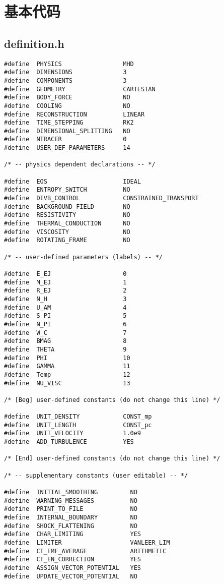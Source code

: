 \chapter{基本代码}
\label{Basic}

\section{definition.h}
\label{def}
\begin{lstlisting}
#define  PHYSICS                 MHD
#define  DIMENSIONS              3
#define  COMPONENTS              3
#define  GEOMETRY                CARTESIAN
#define  BODY_FORCE              NO
#define  COOLING                 NO
#define  RECONSTRUCTION          LINEAR
#define  TIME_STEPPING           RK2
#define  DIMENSIONAL_SPLITTING   NO
#define  NTRACER                 0
#define  USER_DEF_PARAMETERS     14

/* -- physics dependent declarations -- */

#define  EOS                     IDEAL
#define  ENTROPY_SWITCH          NO
#define  DIVB_CONTROL            CONSTRAINED_TRANSPORT
#define  BACKGROUND_FIELD        NO
#define  RESISTIVITY             NO
#define  THERMAL_CONDUCTION      NO
#define  VISCOSITY               NO
#define  ROTATING_FRAME          NO

/* -- user-defined parameters (labels) -- */

#define  E_EJ                    0
#define  M_EJ                    1
#define  R_EJ                    2
#define  N_H                     3
#define  U_AM                    4
#define  S_PI                    5
#define  N_PI                    6
#define  W_C                     7
#define  BMAG                    8
#define  THETA                   9
#define  PHI                     10
#define  GAMMA                   11
#define  Temp                    12
#define  NU_VISC                 13

/* [Beg] user-defined constants (do not change this line) */

#define  UNIT_DENSITY            CONST_mp
#define  UNIT_LENGTH             CONST_pc
#define  UNIT_VELOCITY           1.0e9
#define  ADD_TURBULENCE          YES

/* [End] user-defined constants (do not change this line) */

/* -- supplementary constants (user editable) -- */

#define  INITIAL_SMOOTHING         NO
#define  WARNING_MESSAGES          NO
#define  PRINT_TO_FILE             NO
#define  INTERNAL_BOUNDARY         NO
#define  SHOCK_FLATTENING          NO
#define  CHAR_LIMITING             YES
#define  LIMITER                   VANLEER_LIM
#define  CT_EMF_AVERAGE            ARITHMETIC
#define  CT_EN_CORRECTION          YES
#define  ASSIGN_VECTOR_POTENTIAL   YES
#define  UPDATE_VECTOR_POTENTIAL   NO

\end{lstlisting}

